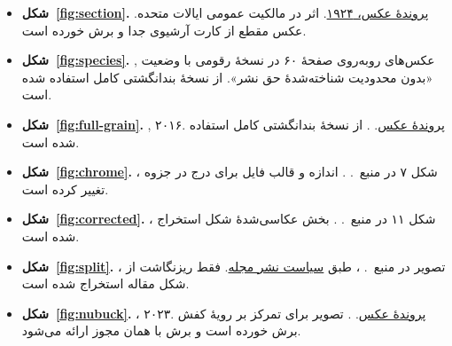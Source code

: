 \begin{itemize}
  \renewcommand{\labelitemi}{\lr{\textbullet}}
  \item \textbf{شکل~\ref{fig:section}.}
  \newline
   \href{https://commons.wikimedia.org/wiki/File:LeatherResearch_002.jpg}{پروندۀ عکس، ۱۹۲۴}.
  اثر در مالکیت عمومی ایالات متحده. عکس مقطع از کارت آرشیوی جدا و برش خورده است.

  \item \textbf{شکل~\ref{fig:species}.} , عکس‌های روبه‌روی صفحۀ ۶۰ در
  نسخۀ رقومی  با وضعیت «بدون محدودیت شناخته‌شدۀ حق نشر». از نسخۀ بندانگشتی کامل استفاده شده است.

  \item \textbf{شکل~\ref{fig:full-grain}.} , ۲۰۱۶.
  \href{https://commons.wikimedia.org/wiki/File:Cuir_pleine_fleur_au_tannage_v%C3%A9g%C3%A9tal_de_la_tannerie_Radermecker_en_Belgique.jpg}{پروندۀ عکس}.
  . از نسخۀ بندانگشتی کامل استفاده شده است.

  \item \textbf{شکل~\ref{fig:chrome}.} ، شکل ۷ در منبع~\cite{chrome}.
  . اندازه و قالب فایل برای درج در جزوه تغییر کرده است.

  \item \textbf{شکل~\ref{fig:corrected}.} ، شکل ۱۱ در منبع~\cite{corrected}.
  . بخش عکاسی‌شدۀ شکل استخراج شده است.

  \item \textbf{شکل~\ref{fig:split}.} ، تصویر  در منبع~\cite{split}.
  ، طبق \href{https://www.revistapielarieincaltaminte.ro/access.html}{سیاست نشر مجله}. فقط ریزنگاشت از شکل مقاله استخراج شده است.

  \item \textbf{شکل~\ref{fig:nubuck}.} ، ۲۰۲۳.
  \href{https://commons.wikimedia.org/wiki/File:Velvety_texture_of_nubuck_leather.jpg}{پروندۀ عکس}.
  . تصویر برای تمرکز بر رویۀ کفش برش خورده است و برش با همان مجوز ارائه می‌شود.


\end{itemize}
